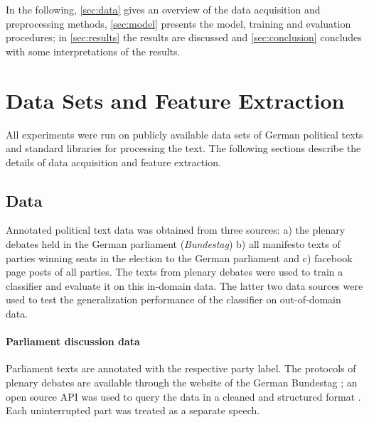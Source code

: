\documentclass[11pt]{article}
\begin{document}
In the following, \autoref{sec:data} gives an overview of the data acquisition and preprocessing methods, \autoref{sec:model} presents the model, training and evaluation procedures; in \autoref{sec:results} the results are discussed and \autoref{sec:conclusion} concludes with some interpretations of the results.

\section{Data Sets and Feature Extraction}\label{sec:data}
%
All experiments were run on publicly available data sets of German political texts and standard libraries for processing the text. The following sections describe the details of data acquisition and feature extraction.

\subsection{Data}
Annotated political text data was obtained from three sources: a) the plenary debates held in the German parliament ({\em Bundestag}) b) all manifesto texts of parties winning seats in the election to the German parliament and c) facebook page posts of all parties. The texts from plenary debates were used to train a classifier and evaluate it on this in-domain data. The latter two data sources were used to test the generalization performance of the classifier on out-of-domain data. 

\paragraph{Parliament discussion data} Parliament texts are annotated with the respective party label. The protocols of plenary debates are available through the website of the German Bundestag \cite{bundestag}; an open source API was used to query the data in a cleaned and structured format \cite{bundestag-github}. Each uninterrupted part was treated as a separate speech. 
\end{document}
